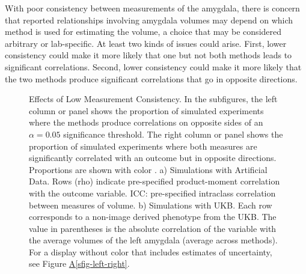 \documentclass[
  authoryear,
  preprint,
  1p]{elsarticle}
\newcommand*\quartosfigref[1]{Figure \hyperref[#1]{A\ref{#1}}}
\begin{document}
With poor consistency between measurements of the amygdala, there is
concern that reported relationships involving amygdala volumes may
depend on which method is used for estimating the volume, a choice that
may be considered arbitrary or lab-specific. At least two kinds of
issues could arise. First, lower consistency could make it more likely
that one but not both methods leads to significant correlations. Second,
lower consistency could make it more likely that the two methods produce
significant correlations that go in opposite directions.

\begin{figure}


\caption{\label{fig-sm-errors}Effects of Low Measurement Consistency. In
the subfigures, the left column or panel shows the proportion of
simulated experiments where the methods produce correlations on opposite
sides of an \(\alpha=0.05\) significance threshold. The right column or
panel shows the proportion of simulated experiments where both measures
are significantly correlated with an outcome but in opposite directions.
Proportions are shown with color \citep{swihart_lasagna_2010}. a)
Simulations with Artificial Data. Rows (rho) indicate pre-specified
product-moment correlation with the outcome variable. ICC: pre-specified
intraclass correlation between measures of volume. b) Simulations with
UKB. Each row corresponds to a non-image derived phenotype from the UKB.
The value in parentheses is the absolute correlation of the variable
with the average volumes of the left amygdala (average across methods).
For a display without color that includes estimates of uncertainty, see
\quartosfigref{sfig-left-right}.}

\end{figure}%
\end{document}
